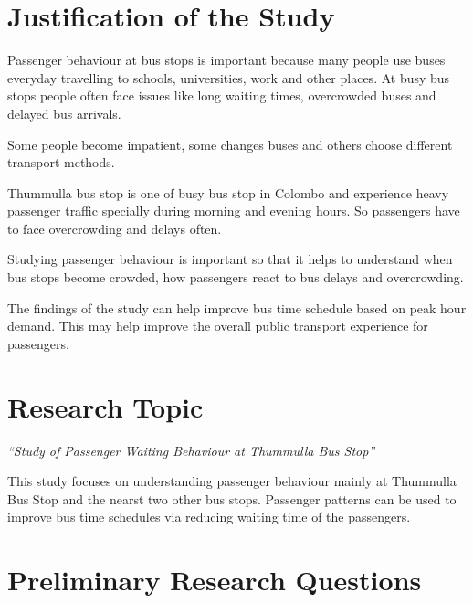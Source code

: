 \documentclass[12pt,a4paper]{report}
\begin{document}

\section{Justification of the Study}

Passenger behaviour at bus stops is important because many  people use buses everyday travelling to schools, universities, work and other places. At busy bus stops people often face issues like long waiting times, overcrowded buses and delayed bus arrivals.

Some people become impatient, some changes buses and others choose different transport methods. 

Thummulla bus stop is one of busy bus stop in Colombo and experience heavy passenger traffic specially during morning and evening hours. So passengers have to face overcrowding and delays often.

Studying passenger behaviour is important  so that it helps to understand when bus stops become crowded, how passengers react to bus delays and overcrowding.

The findings of the study can help improve bus time schedule based on peak hour demand. This may help improve the overall public transport experience for passengers.  


\section{Research Topic}

\begin{center}
\textit{
“Study of Passenger Waiting Behaviour at Thummulla Bus Stop”
}
\end{center}

This study focuses on understanding passenger behaviour  mainly at Thummulla Bus Stop and the nearst two other bus stops. Passenger patterns can be used to improve bus time schedules via reducing waiting time of the passengers.

%



\section{Preliminary Research Questions}
\end{document}
